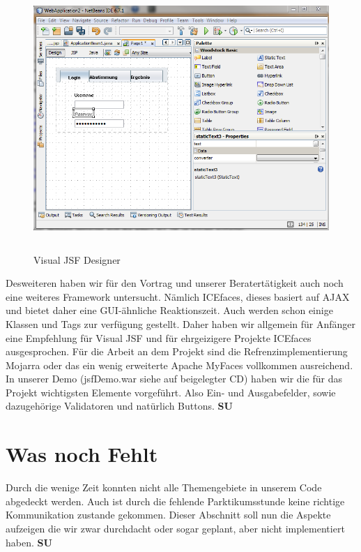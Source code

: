 \documentclass[titlepage, 12pt,a4paper]{scrartcl}
\begin{document}
\begin{figure}[htb]
\begin{center}
\includegraphics[width=15cm, height=10cm]{bilder/VisualJSF.png}
\caption{Visual JSF Designer}
\label{visual-jsf-designer}
\end{center}
\end{figure}

Desweiteren haben wir für den Vortrag und unserer Beratertätigkeit auch noch eine
weiteres Framework untersucht. Nämlich ICEfaces, dieses basiert auf AJAX und bietet
daher eine GUI-ähnliche Reaktionszeit. Auch werden schon einige Klassen und Tags zur 
verfügung gestellt.
Daher haben wir allgemein für Anfänger eine Empfehlung für Visual JSF und für ehrgeizigere
Projekte ICEfaces ausgesprochen. Für die Arbeit an dem Projekt sind die Refrenzimplementierung
Mojarra oder das ein wenig erweiterte Apache MyFaces vollkommen ausreichend. In unserer Demo
(jsfDemo.war siehe auf beigelegter CD) haben wir die für das Projekt wichtigsten Elemente
vorgeführt. Also Ein- und Ausgabefelder, sowie dazugehörige Validatoren und natürlich Buttons.
{\bf{SU}}
\section{Was noch Fehlt}
Durch die wenige Zeit konnten nicht alle Themengebiete in unserem Code abgedeckt werden. 
Auch ist durch die fehlende Parktikumsstunde keine richtige Kommunikation zustande gekommen.
Dieser Abschnitt soll nun die Aspekte aufzeigen die wir zwar durchdacht oder sogar geplant, aber
nicht implementiert haben. 
{\bf{SU}}
\end{document}
